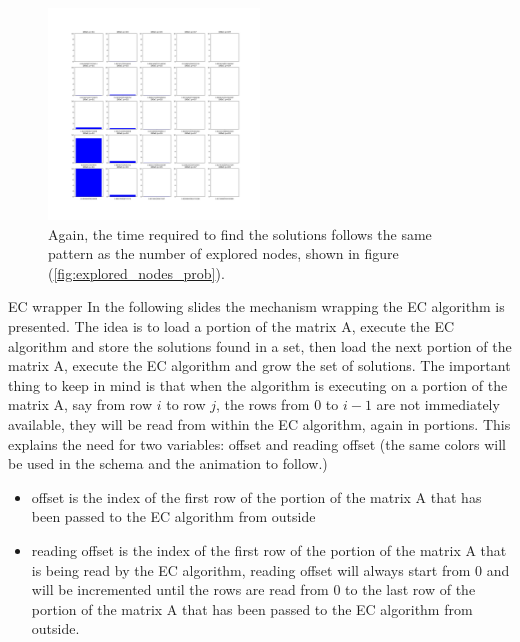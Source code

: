 \documentclass{beamer}
\begin{document}
\begin{frame}{}
    \begin{figure}
        \centering
        \includegraphics[width=0.5\textwidth]{time_to_solve_prob.pdf}
        \caption{Again, the time required to find the solutions follows the same pattern as 
        the number of explored nodes, shown in figure (\ref{fig:explored_nodes_prob}).}
        \label{fig:time_to_solve_prob}
    \end{figure}
\end{frame}

\begin{frame}{EC wrapper}
    In the following slides the mechanism wrapping the EC algorithm
    is presented. 
    The idea is to load a portion of the matrix A, execute the EC algorithm
    and store the solutions found in a set, then load the next portion of
    the matrix A, execute the EC algorithm and grow the set of solutions.
    The important thing to keep in mind is that when the algorithm 
    is executing on a portion of the matrix A, say from row $i$ to row $j$,
    the rows from $0$ to $i-1$ are not immediately available, they will
    be read from within the EC algorithm, again in portions.
    This explains the need for two variables:
    \textcolor{offset}{offset} and \textcolor{reading_offset}{reading offset}
    (the same colors will be used in the schema and the animation to follow.)
\end{frame}

\begin{frame}{}
    \begin{itemize}
        \item \textcolor{offset}{offset} is the index of the first row of the portion
            of the matrix A that has been passed to the EC algorithm from outside
        \item \textcolor{reading_offset}{reading offset} is the index of the first row of the portion
            of the matrix A that is being read by the EC algorithm,
            reading offset will always start from 0 and will be incremented until
            the rows are read from 0 to the last row of the portion of the matrix A 
            that has been passed to the EC algorithm from outside.
    \end{itemize}
\end{frame}
\end{document}
